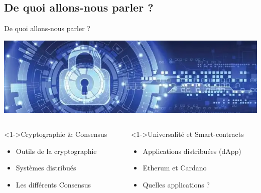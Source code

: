 \documentclass[presentation]{beamer}
\begin{document}
\subsection{De quoi allons-nous parler ?}
\label{sec:orge94a8da}
\begin{frame}[label={sec:orgbe157e8}]{De quoi allons-nous parler ?}
\begin{center}
\includegraphics[width=\textwidth]{Images/consensus_cryptographie.png}
\end{center}
\begin{columns}
\begin{column}{0.46\columnwidth}
\begin{block}<1->{Cryptographie \& Consensus}
\begin{itemize}
\item <1>Outils de la cryptographie
\item <1>Systèmes distribués
\item <1>Les différents Consensus
\end{itemize}
\end{block}
\end{column}

\begin{column}{0.54\columnwidth}
\begin{block}<1->{Universalité et Smart-contracts}
\begin{itemize}
\item <0> Applications distribuées (dApp)
\item <0> Etherum et Cardano
\item <0> Quelles applications ?
\end{itemize}
\end{block}
\end{column}
\end{columns}
\end{frame}
\end{document}
